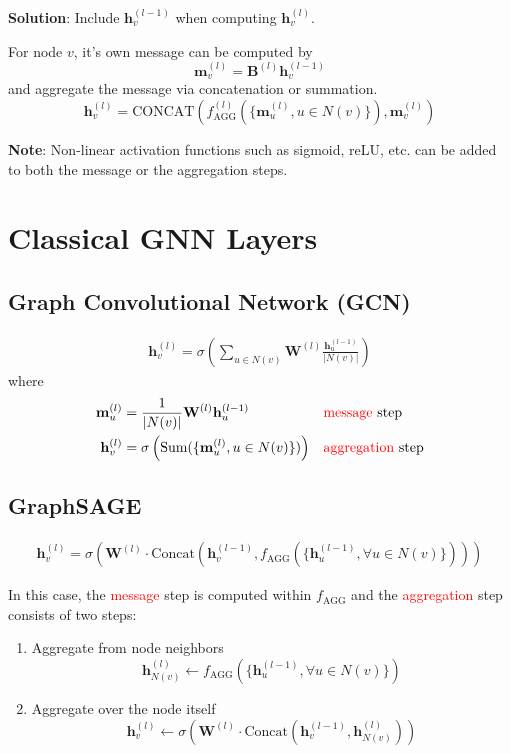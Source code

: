 \documentclass[12pt]{article}
\newcommand{\tbf}{\textbf}
\newcommand{\tcR}{\textcolor{red}}
\newcommand{\mbf}{\mathbf}
\begin{document}
\smallskip
\tbf{Solution}: Include $\mbf{h}_v^{(l-1)}$ when computing $\mbf{h}_v^{(l)}$.

For node $v$, it's own message can be computed by
\[
  \mbf{m}_v^{(l)} = \mbf{B}^{(l)}\mbf{h}_v^{(l-1)}
\]
and aggregate the message via concatenation or summation.
\[
  \mbf{h}_v^{(l)} = \text{CONCAT}\left(f_{\text{AGG}}^{(l)}(\{\mbf{m}_u^{(l)},
  u \in N(v)\}),\mbf{m}_v^{(l)}\right)
\]

\tbf{Note}: Non-linear activation functions such as sigmoid, reLU, etc. can be
added to both the message or the aggregation steps.

\section*{Classical GNN Layers}

\subsection*{Graph Convolutional Network (GCN)}

\begin{align*}
  \mbf{h}_v^{(l)} = \sigma\left(\sum_{u \in N(v)} \mbf{W}^{(l)}
  \frac{\mbf{h}_u^{(l-1)}}{|N(v)|} \right)
\end{align*}
where
\begin{align*}
  \mbf{m}_u^{(l)} &= \frac{1}{|N(v)|} \mbf{W}^{(l)}\mbf{h}_u^{(l-1)} &&
  \text{\tcR{message} step} \\
  \mbf{h}_v^{(l)} &= \sigma\left(\text{Sum}(\{\mbf{m}_u^{(l)},u \in
  N(v)\})\right) && \text{\tcR{aggregation} step} \\
\end{align*}

\subsection*{GraphSAGE}

\begin{align*}
  \mbf{h}_v^{(l)} = \sigma\left(\mbf{W}^{(l)} \cdot
  \text{Concat}\left(\mbf{h}_v^{(l-1)},f_{\text{AGG}}(\{\mbf{h}_u^{(l-1)},
  \forall u \in N(v)\})\right) \right)
\end{align*}

In this case, the \tcR{message} step is computed within $f_{\text{AGG}}$ and the
\tcR{aggregation} step consists of two steps:
\begin{enumerate}
  \itemsep0em
  \item Aggregate from node neighbors
    \[
      \mbf{h}_{N(v)}^{(l)} \leftarrow f_{\text{AGG}}(\{\mbf{h}_u^{(l-1)},
      \forall u \in N(v)\})
    \]
  \item Aggregate over the node itself
    \[
      \mbf{h}_v^{(l)} \leftarrow \sigma\left(\mbf{W}^{(l)} \cdot
      \text{Concat}(\mbf{h}_v^{(l-1)},\mbf{h}_{N(v)}^{(l)})\right)
    \]
\end{enumerate}
\end{document}
